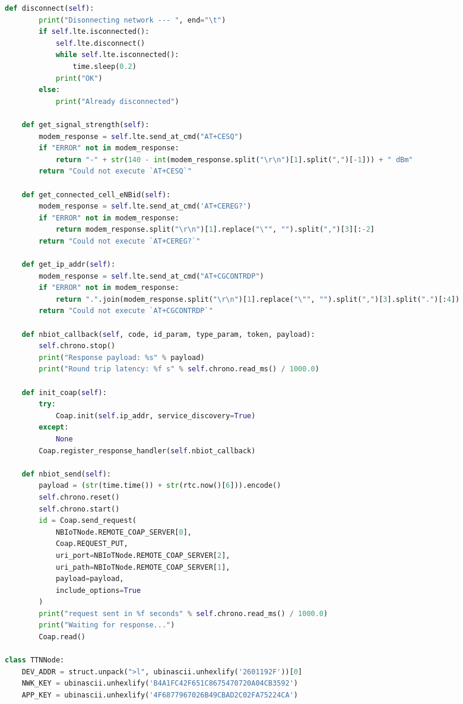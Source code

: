 \documentclass[12pt]{article}
\begin{document}
\begin{spacing}{0.8}
\begin{lstlisting}[language=Python]
    def disconnect(self):
        print("Disonnecting network --- ", end="\t")
        if self.lte.isconnected():
            self.lte.disconnect()
            while self.lte.isconnected():
                time.sleep(0.2)
            print("OK")
        else:
            print("Already disconnected")

    def get_signal_strength(self):
        modem_response = self.lte.send_at_cmd("AT+CESQ")
        if "ERROR" not in modem_response:
            return "-" + str(140 - int(modem_response.split("\r\n")[1].split(",")[-1])) + " dBm"
        return "Could not execute `AT+CESQ`"

    def get_connected_cell_eNBid(self):
        modem_response = self.lte.send_at_cmd('AT+CEREG?')
        if "ERROR" not in modem_response:
            return modem_response.split("\r\n")[1].replace("\"", "").split(",")[3][:-2]
        return "Could not execute `AT+CEREG?`"

    def get_ip_addr(self):
        modem_response = self.lte.send_at_cmd("AT+CGCONTRDP")
        if "ERROR" not in modem_response:
            return ".".join(modem_response.split("\r\n")[1].replace("\"", "").split(",")[3].split(".")[:4])
        return "Could not execute `AT+CGCONTRDP`"

    def nbiot_callback(self, code, id_param, type_param, token, payload):
        self.chrono.stop()
        print("Response payload: %s" % payload)
        print("Round trip latency: %f s" % self.chrono.read_ms() / 1000.0)

    def init_coap(self):
        try:
            Coap.init(self.ip_addr, service_discovery=True)
        except:
            None
        Coap.register_response_handler(self.nbiot_callback)

    def nbiot_send(self):
        payload = (str(time.time()) + str(rtc.now()[6])).encode()
        self.chrono.reset()
        self.chrono.start()
        id = Coap.send_request(
            NBIoTNode.REMOTE_COAP_SERVER[0],
            Coap.REQUEST_PUT,
            uri_port=NBIoTNode.REMOTE_COAP_SERVER[2],
            uri_path=NBIoTNode.REMOTE_COAP_SERVER[1],
            payload=payload,
            include_options=True
        )
        print("request sent in %f seconds" % self.chrono.read_ms() / 1000.0)
        print("Waiting for response...")
        Coap.read()

class TTNNode:
    DEV_ADDR = struct.unpack(">l", ubinascii.unhexlify('2601192F'))[0]
    NWK_KEY = ubinascii.unhexlify('B4A1FC42F651C8675470720A04CB3592')
    APP_KEY = ubinascii.unhexlify('4F6877967026B49CBAD2C02FA75224CA')


\end{lstlisting}
\end{spacing}
\end{document}

